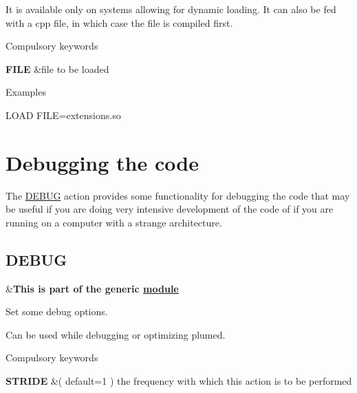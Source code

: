 It is available only on systems allowing for dynamic loading. It can also be fed with a cpp file, in which case the file is compiled first.

\begin{DoxyParagraph}{Compulsory keywords}

\end{DoxyParagraph}
\begin{TabularC}{2}
\hline
{\bfseries  F\+I\+L\+E } &file to be loaded   \\
\end{TabularC}


\begin{DoxyParagraph}{Examples}

\end{DoxyParagraph}
\begin{DoxyVerb}LOAD FILE=extensions.so
\end{DoxyVerb}
 \hypertarget{degub}{}\section{Debugging the code}\label{degub}
The \hyperlink{DEBUG}{D\+E\+B\+U\+G} action provides some functionality for debugging the code that may be useful if you are doing very intensive development of the code of if you are running on a computer with a strange architecture. \hypertarget{DEBUG}{}\subsection{D\+E\+B\+U\+G}\label{DEBUG}
\begin{TabularC}{2}
\hline
&{\bfseries  This is part of the generic \hyperlink{mymodules}{module }}   \\
\end{TabularC}
Set some debug options.

Can be used while debugging or optimizing plumed.

\begin{DoxyParagraph}{Compulsory keywords}

\end{DoxyParagraph}
\begin{TabularC}{2}
\hline
{\bfseries  S\+T\+R\+I\+D\+E } &( default=1 ) the frequency with which this action is to be performed   \\
\end{TabularC}


